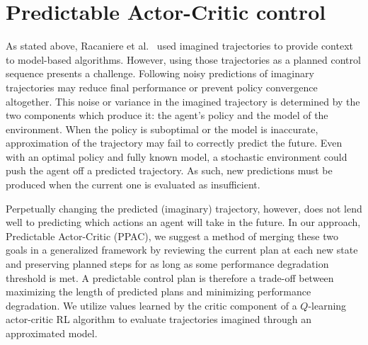 \documentclass{article}
\begin{document}

    \section{Predictable Actor-Critic control} \label{section:PAC}


        As stated above, Racaniere et al.~\citeyear{racaniere2017imagination} used imagined trajectories to provide context to model-based algorithms. However, using those trajectories as a planned control sequence presents a challenge. Following noisy predictions of imaginary trajectories may reduce final performance or prevent policy convergence altogether. This noise or variance in the imagined trajectory is determined by the two components which produce it: the agent's policy and the model of the environment. When the policy is suboptimal or the model is inaccurate, approximation of the trajectory may fail to correctly predict the future. Even with an optimal policy and fully known model, a stochastic environment could push the agent off a predicted trajectory. As such, new predictions must be produced when the current one is evaluated as insufficient.

        Perpetually changing the predicted (imaginary) trajectory, however, does not lend well to predicting which actions an agent will take in the future.
        In our approach, Predictable Actor-Critic (PPAC), we suggest a method of merging these two goals in a generalized framework by reviewing the current plan at each new state and preserving planned steps for as long as some performance degradation threshold is met.
        A predictable control plan is therefore a trade-off between maximizing the length of predicted plans and minimizing performance degradation. We utilize values learned by the critic component of a $Q$-learning actor-critic RL algorithm to evaluate trajectories imagined through an approximated model.
\end{document}
